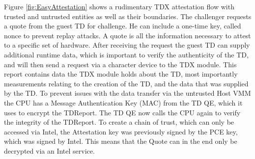 Figure \ref{fig:EasyAttestation} shows a rudimentary TDX attestation flow with trusted and untrusted entities as well as their boundaries. The challenger requests a quote from the guest TD for challenge. He can include a one-time key, called nonce to prevent replay attacks. A quote is all the information necessary to attest to a specific set of hardware. After receiving the request the guest TD can supply additional runtime data, which is important to verify the authenticity of the TD, and will then send a request via a character device to the TDX module. This report contains data the TDX module holds about the TD, most importantly measurements relating to the creation of the TD, and the data that was supplied by the TD. To prevent issues with the data transfer via the untrusted Host VMM the CPU has a Message Authentication Key (MAC) from the TD QE, which it uses to encrypt the TDReport. The TD QE now calls the CPU again to verify the integrity of the TDReport.
To create a chain of trust, which can only be accessed via Intel, the Attestation key was previously signed by the PCE key, which was signed by Intel. This means that the Quote can in the end only be decrypted via an Intel service.

